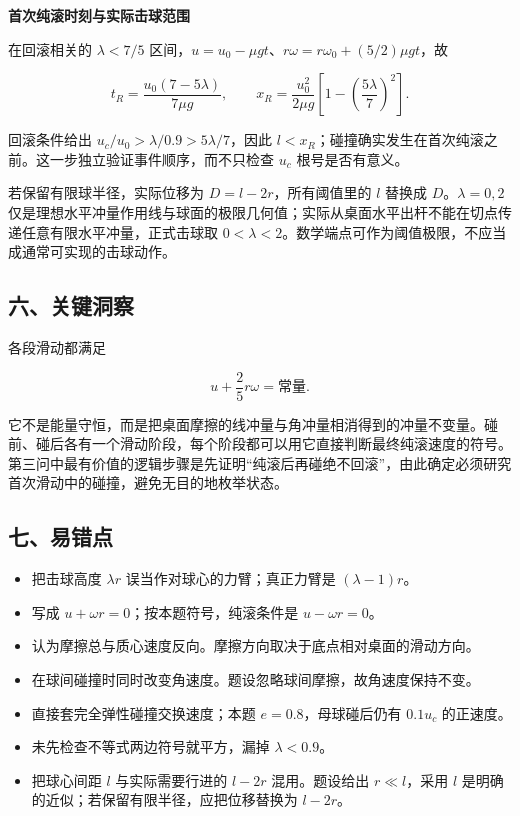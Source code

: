 \documentclass[12pt,a4paper,UTF8]{ctexart}
\newcommand{\tightlist}{\setlength{\itemsep}{0pt}\setlength{\parskip}{0pt}}
\begin{document}
\textbf{首次纯滚时刻与实际击球范围}

在回滚相关的 \(\lambda<7/5\)
区间，\(u=u_0-\mu gt\)、\(r\omega=r\omega_0+(5/2)\mu gt\)，故

\[t_R=\frac{u_0(7-5\lambda)}{7\mu g},\qquad
x_R=\frac{u_0^2}{2\mu g}\left[1-\left(\frac{5\lambda}{7}\right)^2\right].\]

回滚条件给出 \(u_c/u_0>\lambda/0.9>5\lambda/7\)，因此
\(l<x_R\)；碰撞确实发生在首次纯滚之前。这一步独立验证事件顺序，而不只检查
\(u_c\) 根号是否有意义。

若保留有限球半径，实际位移为 \(D=l-2r\)，所有阈值里的 \(l\) 替换成
\(D\)。\(\lambda=0,2\)
仅是理想水平冲量作用线与球面的极限几何值；实际从桌面水平出杆不能在切点传递任意有限水平冲量，正式击球取
\(0<\lambda<2\)。数学端点可作为阈值极限，不应当成通常可实现的击球动作。

\subsection{六、关键洞察}\label{ux516dux5173ux952eux6d1eux5bdf}

各段滑动都满足

\[u+\frac25r\omega=\text{常量}.\]

它不是能量守恒，而是把桌面摩擦的线冲量与角冲量相消得到的冲量不变量。碰前、碰后各有一个滑动阶段，每个阶段都可以用它直接判断最终纯滚速度的符号。第三问中最有价值的逻辑步骤是先证明``纯滚后再碰绝不回滚''，由此确定必须研究首次滑动中的碰撞，避免无目的地枚举状态。

\subsection{七、易错点}\label{ux4e03ux6613ux9519ux70b9}

\begin{itemize}
\tightlist
\item
  把击球高度 \(\lambda r\) 误当作对球心的力臂；真正力臂是
  \((\lambda-1)r\)。
\item
  写成 \(u+\omega r=0\)；按本题符号，纯滚条件是 \(u-\omega r=0\)。
\item
  认为摩擦总与质心速度反向。摩擦方向取决于底点相对桌面的滑动方向。
\item
  在球间碰撞时同时改变角速度。题设忽略球间摩擦，故角速度保持不变。
\item
  直接套完全弹性碰撞交换速度；本题 \(e=0.8\)，母球碰后仍有 \(0.1u_c\)
  的正速度。
\item
  未先检查不等式两边符号就平方，漏掉 \(\lambda<0.9\)。
\item
  把球心间距 \(l\) 与实际需要行进的 \(l-2r\) 混用。题设给出
  \(r\ll l\)，采用 \(l\) 是明确的近似；若保留有限半径，应把位移替换为
  \(l-2r\)。
\end{itemize}
\end{document}
